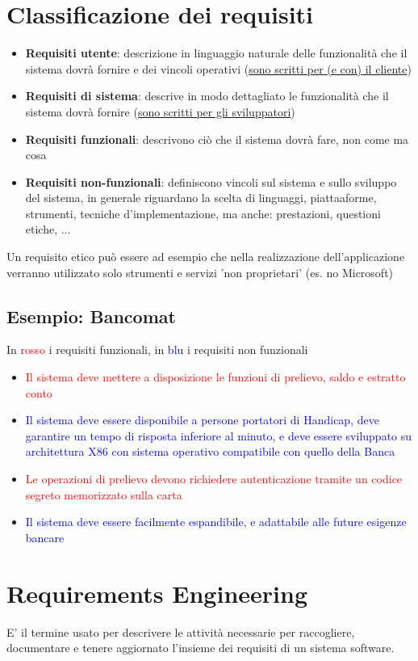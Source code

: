 \documentclass[12pt, a4paper]{report}
\begin{document}
\section{Classificazione dei requisiti}
\begin{itemize}
    \item \textbf{Requisiti utente}: descrizione in linguaggio naturale delle funzionalità che il sistema dovrà fornire e dei vincoli operativi (\underline{sono scritti per (e con) il cliente})
    \item \textbf{Requisiti di sistema}: descrive in modo dettagliato le funzionalità che il sistema dovrà fornire (\underline{sono scritti per gli sviluppatori})
    \item \textbf{Requisiti funzionali}: descrivono ciò che il sistema dovrà fare, non come ma cosa
    \item \textbf{Requisiti non-funzionali}: definiscono vincoli sul sistema e sullo sviluppo del sistema, in generale riguardano la scelta di linguaggi, piattaaforme, strumenti, tecniche d'implementazione, ma anche: prestazioni, questioni etiche, ...
\end{itemize}
Un requisito etico può essere ad esempio che nella realizzazione dell'applicazione verranno utilizzato solo strumenti e servizi 'non proprietari' (es. no Microsoft)
\subsection{Esempio: Bancomat}
In \textcolor{red}{rosso} i requisiti funzionali, in \textcolor{blue}{blu} i requisiti non funzionali
\begin{itemize}
    \item \textcolor{red}{Il sistema deve mettere a disposizione le funzioni di prelievo, saldo e estratto conto}
    \item \textcolor{blue}{Il sistema deve essere disponibile a persone portatori di Handicap, deve garantire un tempo di risposta inferiore al minuto, e deve essere sviluppato su architettura X86 con sistema operativo compatibile con quello della Banca}
    \item \textcolor{red}{Le operazioni di prelievo devono richiedere autenticazione tramite un codice segreto memorizzato sulla carta}
    \item \textcolor{blue}{Il sistema deve essere facilmente espandibile, e adattabile alle future esigenze bancare}
\end{itemize}
\section{Requirements Engineering}
E' il termine usato per descrivere le attività necessarie per raccogliere, documentare e tenere aggiornato l'insieme dei requisiti di un sistema software.
\end{document}
